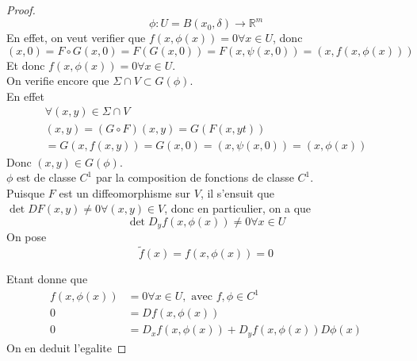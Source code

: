 \documentclass[../main.tex]{subfiles}
\begin{document}
\begin{proof}
\[ 
	\phi: U = B( x_0,\delta) \to \mathbb{R}^m
\]
En effet, on veut verifier que $f( x,\phi( x) ) =0 \forall x \in U$, donc
\[ 
	( x,0) = F\circ G( x,0)  = F( G( x,0) ) = F( x,\psi( x,0) ) = ( x,f( x,\phi( x) ) ) 
\]
Et donc $f( x,\phi( x) )=0\forall x \in U $.\\
On verifie encore que $\Sigma \cap V \subset G( \phi) $.\\
En effet
\begin{align*}
	\forall ( x,y)  \in \Sigma \cap V \\
	( x,y) = ( G\circ F) ( x,y)  = G( F( x,yt) ) \\
	= G( x,f( x,y) ) = G(x,0) = ( x,\psi( x,0) ) = ( x,\phi( x) ) 
\end{align*}
Donc $( x,y) \in G( \phi) $.\\
$\phi$ est de classe $C^{1} $ par la composition de fonctions de classe $C^{1}$.\\
Puisque $F$ est un diffeomorphisme sur $V$, il s'ensuit que $\det DF( x,y) \neq 0 \forall ( x,y) \in V$, donc en particulier, on a que
\[ 
	\det D_y f( x,\phi( x) ) \neq 0 \forall x \in U
\]
On pose
\[ 
	\tilde f( x) = f( x,\phi( x) ) =0
\]

Etant donne que 
\begin{align*}
	f( x,\phi( x) ) &= 0 \forall x \in U, \text{ avec } f,\phi \in C^{1}\\
	0 &= Df( x,\phi( x) ) \\
	0 &= D_x f( x,\phi( x) ) + D_y f( x,\phi( x) ) D \phi( x) 
\end{align*}
On en deduit l'egalite



\end{proof}
\end{document}
